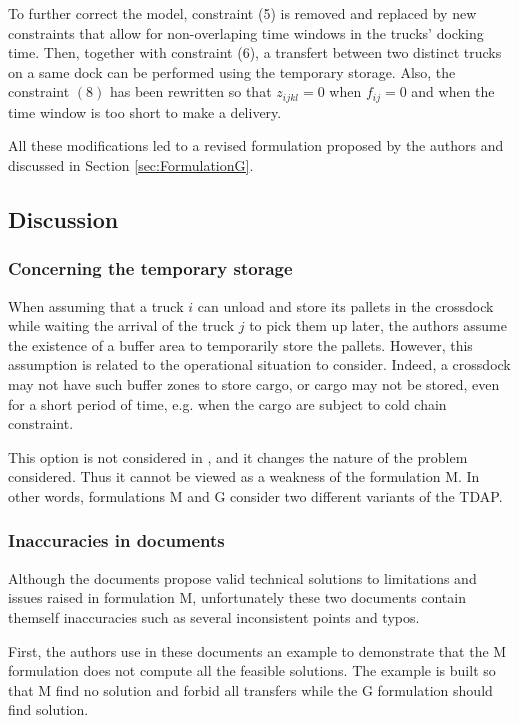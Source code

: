 \documentclass[preprint,12pt,authoryear]{elsarticle}
\begin{document}
To further correct the model, constraint (5) is removed and replaced by new constraints that allow for non-overlaping time windows in the trucks' docking time. Then, together with constraint (6), a transfert between two distinct trucks on a same dock can be performed using the temporary storage.
%
Also, the constraint $(8)$  has been rewritten so that $z_{ijkl}=0$ when $f_{ij}=0$ and when the time window is too short to make a delivery. 

All these modifications led to a revised formulation proposed by the authors and discussed in Section \ref{sec:FormulationG}.


\subsection{Discussion}

%
%
\subsubsection{Concerning the temporary storage}
 When assuming that a truck $i$ can unload and store its pallets in the crossdock while waiting the arrival of the truck $j$ to pick them up later, the authors assume the existence of a buffer area to temporarily store the pallets. However, this assumption is related to the operational situation to  consider.
    Indeed, a crossdock may not have such buffer zones to store cargo, or cargo may not be stored, even for a short period of time, e.g. when the cargo are subject to cold chain constraint.

This option is not considered in \citep{MIAO2009}, and it changes the nature of the problem considered. Thus it cannot be viewed as a weakness of the formulation M. 
In other words,  formulations M and G  consider two different variants of the TDAP.
 

%
%
\subsubsection{Inaccuracies in documents}
Although the documents \citet{Gelareh2015,Gelareh2021} propose valid technical solutions to limitations and issues raised  in  formulation M, unfortunately these two documents contain themself inaccuracies such as several inconsistent points and typos.

 First, the authors use in these documents an example to demonstrate that the M formulation does not compute all the feasible solutions. The example is built so that M find no solution and forbid all transfers while the G formulation should find solution. 
\end{document}
